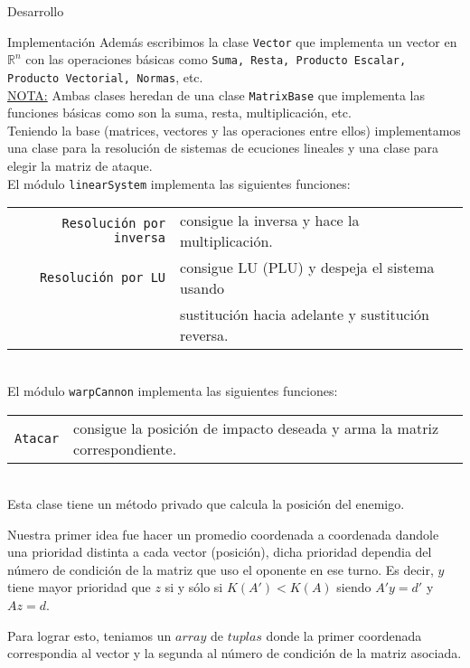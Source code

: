 \begin{section}{Desarrollo}
\begin{subsection}{Implementación}
		Además escribimos la clase \texttt{Vector} que implementa un vector en $\mathbb{R}^n$ con las operaciones básicas como \texttt{Suma, Resta,
		Producto Escalar, Producto Vectorial, Normas}, etc.\\
		
		\underline{NOTA:} Ambas clases heredan de una clase \texttt{MatrixBase} que implementa las funciones básicas como son la suma, resta, multiplicación, etc.\\
		
		Teniendo la base (matrices, vectores y las operaciones entre ellos) implementamos una clase para la resolución de sistemas de ecuciones lineales y una clase para elegir la matriz de ataque.\\
		
		El módulo \texttt{linearSystem} implementa las siguientes funciones:\\
		
		\begin{tabular}{rl}
			\texttt{Resolución por inversa} & consigue la inversa y hace la multiplicación.\\
			\texttt{Resolución por LU} & consigue LU (PLU) y despeja el sistema usando\\
									   & sustitución hacia adelante y sustitución reversa.\\
		\end{tabular}\\
		
		El módulo \texttt{warpCannon} implementa las siguientes funciones:\\
		
		\begin{tabular}{rl}
			\texttt{Atacar} & consigue la posición de impacto deseada y arma la matriz correspondiente.\\
		\end{tabular}\\
		
		Esta clase tiene un método privado que calcula la posición del enemigo.
		
		Nuestra primer idea fue hacer un promedio coordenada a coordenada dandole una prioridad distinta a cada vector (posición), dicha prioridad dependia del número de condición de la matriz que uso el oponente en ese turno. Es decir, $y$ tiene mayor prioridad que $z$ si y sólo si $K(A')<K(A)$ siendo $A'y=d'$ y $Az=d$.
		
		Para lograr esto, teniamos un $array$ de $tuplas$ donde la primer coordenada correspondia al vector y la segunda al número de condición de la matriz asociada.
		

\end{subsection}
\end{section}
